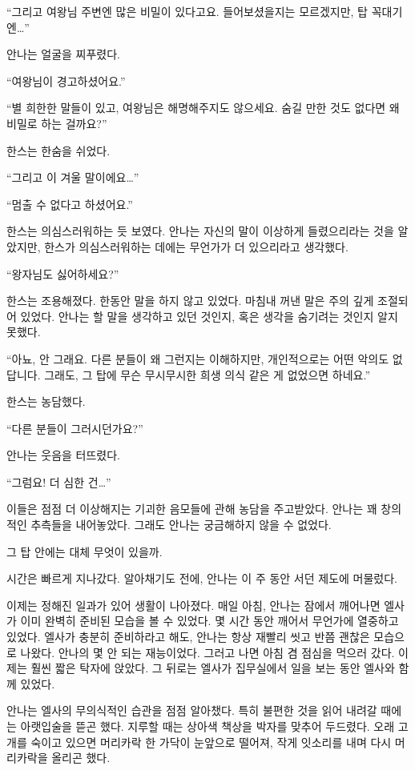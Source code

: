 ``그리고 여왕님 주변엔 많은 비밀이 있다고요. 들어보셨을지는 모르겠지만, 탑 꼭대기엔\ldots''

안나는 얼굴을 찌푸렸다.

``여왕님이 경고하셨어요.''

``별 희한한 말들이 있고, 여왕님은 해명해주지도 않으세요. 숨길 만한 것도 없다면 왜 비밀로 하는 걸까요?''

한스는 한숨을 쉬었다.

``그리고 이 겨울 말이에요\ldots''

``멈출 수 없다고 하셨어요.''

한스는 의심스러워하는 듯 보였다. 안나는 자신의 말이 이상하게 들렸으리라는 것을 알았지만, 한스가 의심스러워하는 데에는 무언가가 더 있으리라고 생각했다.

``왕자님도 싫어하세요?''

한스는 조용해졌다. 한동안 말을 하지 않고 있었다. 마침내 꺼낸 말은 주의 깊게 조절되어 있었다. 안나는 할 말을 생각하고 있던 것인지, 혹은 생각을 숨기려는 것인지 알지 못했다.

``아뇨, 안 그래요. 다른 분들이 왜 그런지는 이해하지만, 개인적으로는 어떤 악의도 없답니다. 그래도, 그 탑에 무슨 무시무시한 희생 의식 같은 게 없었으면 하네요.''

한스는 농담했다.

``다른 분들이 그러시던가요?''

안나는 웃음을 터뜨렸다.

``그럼요! 더 심한 건\ldots''

이들은 점점 더 이상해지는 기괴한 음모들에 관해 농담을 주고받았다. 안나는 꽤 창의적인 추측들을 내어놓았다. 그래도 안나는 궁금해하지 않을 수 없었다.

그 탑 안에는 대체 무엇이 있을까.

\textbreak

시간은 빠르게 지나갔다. 알아채기도 전에, 안나는 이 주 동안 서던 제도에 머물렀다.

이제는 정해진 일과가 있어 생활이 나아졌다. 매일 아침, 안나는 잠에서 깨어나면 엘사가 이미 완벽히 준비된 모습을 볼 수 있었다. 몇 시간 동안 깨어서 무언가에 열중하고 있었다. 엘사가 충분히 준비하라고 해도, 안나는 항상 재빨리 씻고 반쯤 괜찮은 모습으로 나왔다. 안나의 몇 안 되는 재능이었다. 그러고 나면 아침 겸 점심을 먹으러 갔다. 이제는 훨씬 짧은 탁자에 앉았다. 그 뒤로는 엘사가 집무실에서 일을 보는 동안 엘사와 함께 있었다.

안나는 엘사의 무의식적인 습관을 점점 알아챘다. 특히 불편한 것을 읽어 내려갈 때에는 아랫입술을 뜯곤 했다. 지루할 때는 상아색 책상을 박자를 맞추어 두드렸다. 오래 고개를 숙이고 있으면 머리카락 한 가닥이 눈앞으로 떨어져, 작게 잇소리를 내며 다시 머리카락을 올리곤 했다.


